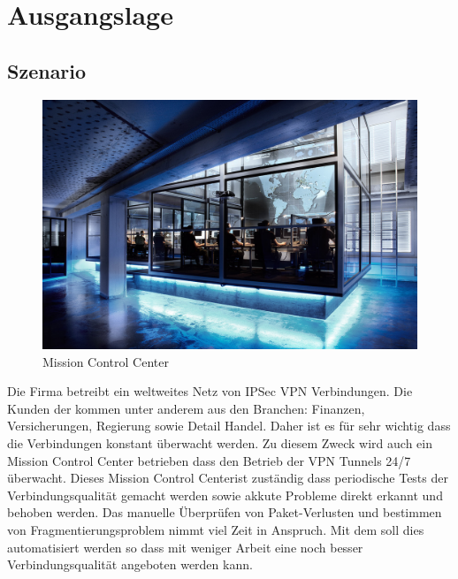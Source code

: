 \section{Ausgangslage}
\label{sec:Ausgangslage}

\subsection{Szenario}

\begin{figure}
  \begin{center}
    \includegraphics[clip,scale=0.15]{mainpart/anforderungen/img/gallery_mc_01}
    \caption{Mission Control Center}
  \end{center}
\end{figure}

Die Firma \osag betreibt ein weltweites Netz von \acs{IPSec} \acs{VPN} Verbindungen. Die Kunden der \osag kommen unter anderem aus den Branchen: Finanzen, Versicherungen, Regierung sowie Detail Handel. Daher ist es für \osag sehr wichtig dass die Verbindungen konstant überwacht werden. Zu diesem Zweck wird auch ein Mission Control Center betrieben dass den Betrieb der \acs{VPN} Tunnels 24/7 überwacht. Dieses Mission Control Center\footnotemark[1] ist zuständig dass periodische Tests der Verbindungsqualität gemacht werden sowie akkute Probleme direkt erkannt und behoben werden. Das manuelle Überprüfen von Paket-Verlusten und bestimmen von Fragmentierungsproblem nimmt viel Zeit in Anspruch. Mit dem \tool soll dies automatisiert werden so dass mit weniger Arbeit eine noch besser Verbindungsqualität angeboten werden kann.

